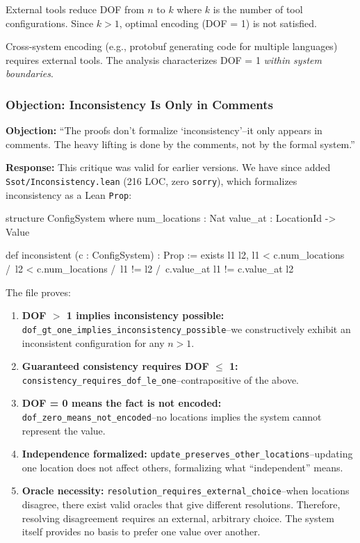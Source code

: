 External tools reduce DOF from $n$ to $k$ where $k$ is the number of tool configurations. Since $k > 1$, optimal encoding (DOF = 1) is not satisfied.

Cross-system encoding (e.g., protobuf generating code for multiple languages) requires external tools. The analysis characterizes DOF = 1 \emph{within system boundaries}.


\subsubsection{Objection: Inconsistency Is Only in Comments}

\textbf{Objection:} ``The proofs don't formalize `inconsistency'--it only appears in comments. The heavy lifting is done by the comments, not by the formal system.''

\textbf{Response:} This critique was valid for earlier versions. We have since added \texttt{Ssot/Inconsistency.lean} (216 LOC, zero \texttt{sorry}), which formalizes inconsistency as a Lean \texttt{Prop}:

\begin{code}
structure ConfigSystem where
  num_locations : Nat
  value_at : LocationId -> Value

def inconsistent (c : ConfigSystem) : Prop :=
  exists l1 l2, l1 < c.num_locations /\ l2 < c.num_locations /\
                l1 != l2 /\ c.value_at l1 != c.value_at l2
\end{code}

The file proves:

\begin{enumerate}
\item \textbf{DOF $>$ 1 implies inconsistency possible:} \texttt{dof\_gt\_one\_implies\_inconsistency\_possible}--we constructively exhibit an inconsistent configuration for any $n > 1$.

\item \textbf{Guaranteed consistency requires DOF $\leq$ 1:} \texttt{consistency\_requires\_dof\_le\_one}--contrapositive of the above.

\item \textbf{DOF = 0 means the fact is not encoded:} \texttt{dof\_zero\_means\_not\_encoded}--no locations implies the system cannot represent the value.

\item \textbf{Independence formalized:} \texttt{update\_preserves\_other\_locations}--updating one location does not affect others, formalizing what ``independent'' means.

\item \textbf{Oracle necessity:} \texttt{resolution\_requires\_external\_choice}--when locations disagree, there exist valid oracles that give different resolutions. Therefore, resolving disagreement requires an external, arbitrary choice. The system itself provides no basis to prefer one value over another.
\end{enumerate}

